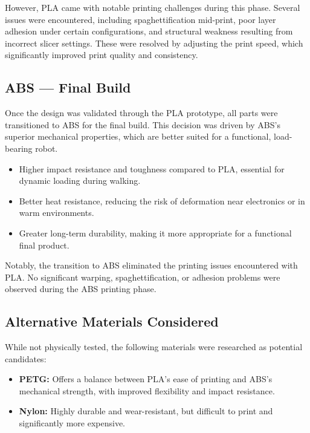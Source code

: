 \documentclass{article}
\begin{document}
However, PLA came with notable printing challenges during this phase. Several issues were encountered, including spaghettification mid-print, poor layer adhesion under certain configurations, and structural weakness resulting from incorrect slicer settings. These were resolved by adjusting the print speed, which significantly improved print quality and consistency.

\subsection*{ABS --- Final Build}

Once the design was validated through the PLA prototype, all parts were transitioned to ABS for the final build. This decision was driven by ABS's superior mechanical properties, which are better suited for a functional, load-bearing robot.

\begin{itemize}
    \item Higher impact resistance and toughness compared to PLA, essential for dynamic loading during walking.
    \item Better heat resistance, reducing the risk of deformation near electronics or in warm environments.
    \item Greater long-term durability, making it more appropriate for a functional final product.
\end{itemize}

Notably, the transition to ABS eliminated the printing issues encountered with PLA. No significant warping, spaghettification, or adhesion problems were observed during the ABS printing phase.

\subsection*{Alternative Materials Considered}

While not physically tested, the following materials were researched as potential candidates:

\begin{itemize}
    \item \textbf{PETG:} Offers a balance between PLA's ease of printing and ABS's mechanical strength, with improved flexibility and impact resistance.
    \item \textbf{Nylon:} Highly durable and wear-resistant, but difficult to print and significantly more expensive.
\end{itemize}
\end{document}

